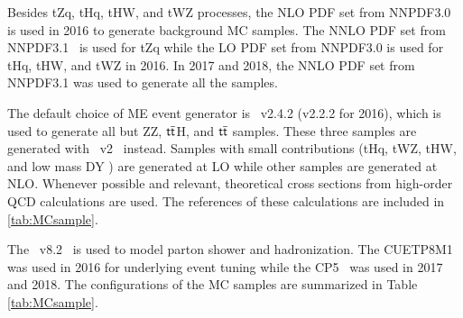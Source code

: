 Besides tZq, tHq, tHW, and tWZ processes, the \ac{NLO} \ac{PDF} set from NNPDF3.0~\cite{NNPDF:2014otw} is used in 2016 to generate background \ac{MC} samples. The \ac{NNLO} \ac{PDF} set from NNPDF3.1~\cite{NNPDF:2017mvq} is used for tZq while the \ac{LO} \ac{PDF} set from NNPDF3.0 is used for tHq, tHW, and tWZ in 2016. In 2017 and 2018, the \ac{NNLO} \ac{PDF} set from NNPDF3.1 was used to generate all the samples. 

The default choice of \ac{ME} event generator is \MG~v2.4.2 (v2.2.2 for 2016), which is used to generate all but ZZ, $\textsf{t}\overline{\textsf{t}}$H, and $\textsf{t}\overline{\textsf{t}}$ samples. These three samples are generated with \Pow~v2~\cite{Frixione:2007vw} instead. Samples with small contributions (tHq, tWZ, tHW, and low mass \ac{DY} ) are generated at \ac{LO} while other samples are generated at \ac{NLO}. Whenever possible and relevant, theoretical cross sections from high-order \ac{QCD} calculations are used. The references of these calculations are included in \ref{tab:MCsample}.

The \PY~v8.2~\cite{Sjostrand:2014zea} is used to model parton shower and hadronization. The CUETP8M1~\cite{CMS:2015wcf} was used in 2016 for underlying event tuning while the CP5~\cite{CMS:2019csb} was used in 2017 and 2018. The configurations of the \ac{MC} samples are summarized in Table \ref{tab:MCsample}. 

